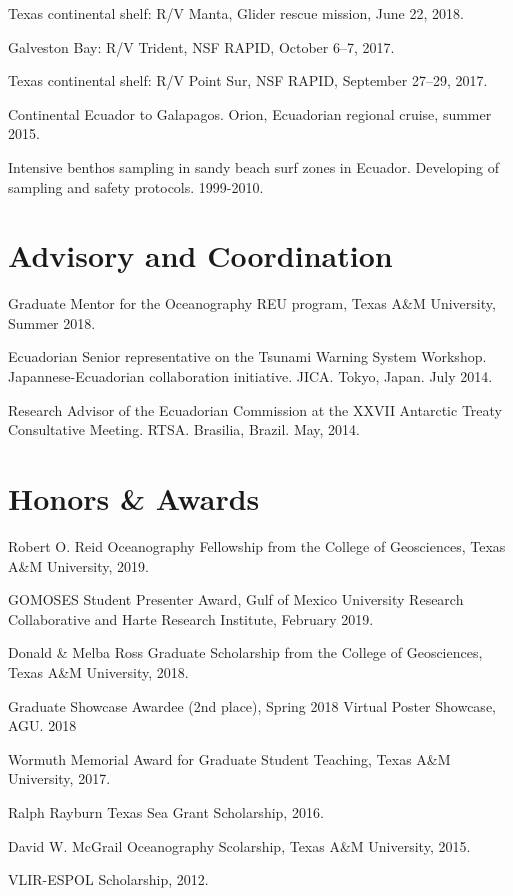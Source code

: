 \documentclass[10pt,letterpaper]{article}
\renewenvironment{itemize}{
  \begin{list}{}{
    \setlength{\leftmargin}{1.5em}
    \setlength{\itemsep}{0.25em}
    \setlength{\parskip}{0pt}
    \setlength{\parsep}{0.25em}
  }
}{
  \end{list}
}
\begin{document}
\begin{itemize}
    \item Texas continental shelf: R/V Manta, Glider rescue mission, June 22, 2018.
    \item  Galveston Bay: R/V Trident, NSF RAPID, October 6--7, 2017.
    \item Texas continental shelf: R/V Point Sur, NSF RAPID, September 27--29, 2017.
    \item Continental Ecuador to Galapagos. Orion, Ecuadorian regional cruise, summer 2015.
    \item Intensive benthos sampling in sandy beach surf zones in Ecuador. Developing of sampling and safety protocols. 1999-2010.
\end{itemize}

\section*{Advisory and Coordination}

\begin{itemize}
    \item Graduate Mentor for the Oceanography REU program, Texas A\&M University, Summer 2018.
    \item Ecuadorian Senior representative on the Tsunami Warning System Workshop. Japannese-Ecuadorian collaboration initiative. JICA. Tokyo, Japan. July 2014.
    \item Research Advisor of the Ecuadorian Commission at the XXVII Antarctic Treaty Consultative Meeting. RTSA. Brasilia, Brazil. May, 2014.
\end{itemize}

\section*{Honors \& Awards}

\begin{itemize}

\item Robert O. Reid Oceanography Fellowship from the College of Geosciences, Texas A\&M University, 2019.
\item GOMOSES Student Presenter Award, Gulf of Mexico University Research Collaborative and Harte Research Institute, February 2019.
\item Donald \& Melba Ross Graduate Scholarship from the College of Geosciences, Texas A\&M University, 2018.
\item Graduate Showcase Awardee (2nd place), Spring 2018 Virtual Poster Showcase, AGU. 2018
\item Wormuth Memorial Award for Graduate Student Teaching, Texas A\&M University, 2017.
\item Ralph Rayburn Texas Sea Grant Scholarship, 2016.
\item David W. McGrail Oceanography Scolarship, Texas A\&M University, 2015.
\item VLIR-ESPOL Scholarship, 2012.
\end{itemize}
\end{document}
